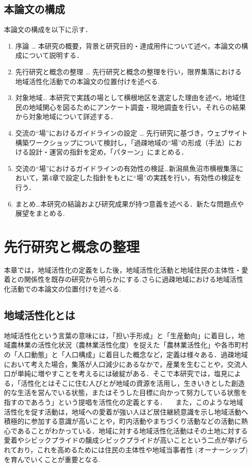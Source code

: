 \documentclass[a4paper]{jsarticle}
\begin{document}
\subsection{本論文の構成}
本論文の構成を以下に示す．
\begin{enumerate}
\item 序論 … 本研究の概要，背景と研究目的・達成用件について述べ，本論文の構成について説明する．
\item 先行研究と概念の整理 … 先行研究と概念の整理を行い，限界集落における地域活性化活動での本論文の位置付けを述べる.

\item 対象地域… 本研究で実践の場として横根地区を選定した理由を述べ，地域住民の地域関心を図るためにアンケート調査・現地調査を行い，それらの結果から対象地域について詳述する．
\item 交流の“場”におけるガイドラインの設定 … 先行研究に基づき，ウェブサイト構築ワークショップについて検討し，「過疎地域の“場”の形成（手法）における設計・運営の指針を定め，「パターン」にまとめる．

\item 交流の“場”におけるガイドラインの有効性の検証…新潟県魚沼市横根集落において，第4章で設定した指針をもとに“場”の実践を行い，有効性の検証を行う．
\item まとめ…本研究の結論および研究成果が持つ意義を述べる．新たな問題点や展望をまとめる.


\end{enumerate}

\newpage

\section{先行研究と概念の整理}
本章では，地域活性化の定義をした後，地域活性化活動と地域住民の主体性・愛着との関係性を既存の研究から明らかにする.さらに過疎地域における地域活性化活動での本論文の位置付けを述べる.
\subsection{地域活性化とは}
地域活性化という言葉の意味には，「担い手形成」と「生産動向」に着目し，地域農林業の活性化状況（農林業活性化度）を捉えた「農林業活性化」や各市町村の「人口動態」と「人口構成」に着目した概念など，定義は様々ある．過疎地域において考えた場合，集落が人口減少にあるなかで，産業を生むことや，交流人口が単純に増やすことを考えるには破綻がある．そこで本研究では，塩見による，「活性化とはそこに住む人びとが地域の資源を活用し，生きいきとした創造的な生活を営んでいる状態，またはそうした目標に向かって努力している状態を指すのであろう」という提唱を活性化の定義とする．
　また，このような地域活性化を促す活動は，地域への愛着が強い人ほど居住継続意識を示し地域活動へ積極的に参加する意識が高いことや，町内活動やまちづくり活動などの活動に熱心であること\cite{8}がわかっている．地域に対する地域活性化活動はその土地に対する愛着やシビックプライドの醸成シビックプライドが高いことという二点が挙げられており，これを高めるためには住民の主体性や地域当事者性 (オーナーシップ) を育んでいくことが重要となる.
\end{document}
